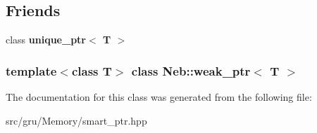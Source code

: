 \subsection*{\-Friends}
\begin{DoxyCompactItemize}
\item 
\hypertarget{classNeb_1_1weak__ptr_af421c41ed797729bb606ba7df50551aa}{class {\bfseries unique\-\_\-ptr$<$ T $>$}}\label{classNeb_1_1weak__ptr_af421c41ed797729bb606ba7df50551aa}

\end{DoxyCompactItemize}
\subsubsection*{template$<$class \-T$>$ class Neb\-::weak\-\_\-ptr$<$ T $>$}



\-The documentation for this class was generated from the following file\-:\begin{DoxyCompactItemize}
\item 
src/gru/\-Memory/smart\-\_\-ptr.\-hpp\end{DoxyCompactItemize}
